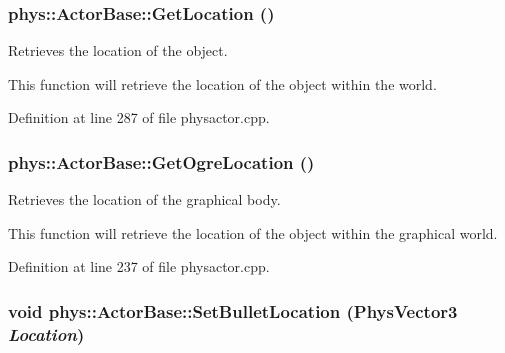 \hypertarget{classphys_1_1ActorBase_ae402982d8c62acac7a122f24a289731d}{
\subsubsection[{GetLocation}]{ phys::ActorBase::GetLocation ()}}
\label{d8/d0f/classphys_1_1ActorBase_ae402982d8c62acac7a122f24a289731d}


Retrieves the location of the object. 

This function will retrieve the location of the object within the world. 

Definition at line 287 of file physactor.cpp.

\hypertarget{classphys_1_1ActorBase_a52a65d23c76c805f4851191b62712ed8}{
\subsubsection[{GetOgreLocation}]{ phys::ActorBase::GetOgreLocation ()}}
\label{d8/d0f/classphys_1_1ActorBase_a52a65d23c76c805f4851191b62712ed8}


Retrieves the location of the graphical body. 

This function will retrieve the location of the object within the graphical world. 

Definition at line 237 of file physactor.cpp.

\hypertarget{classphys_1_1ActorBase_ab8d8c68937ea92b245b411c07b8bde7a}{
\subsubsection[{SetBulletLocation}]{\setlength{\rightskip}{0pt plus 5cm}void phys::ActorBase::SetBulletLocation ({\bf PhysVector3} {\em Location})}}
\label{d8/d0f/classphys_1_1ActorBase_ab8d8c68937ea92b245b411c07b8bde7a}


